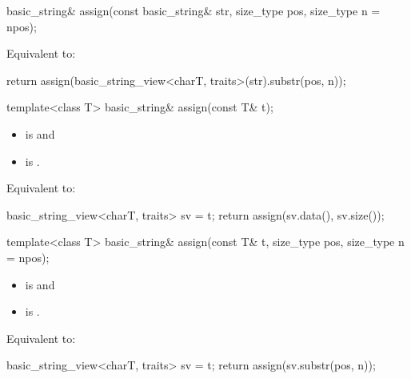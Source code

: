 %
\begin{itemdecl}
basic_string& assign(const basic_string& str, size_type pos, size_type n = npos);
\end{itemdecl}

\begin{itemdescr}
\pnum
\effects
Equivalent to:
\begin{codeblock}
return assign(basic_string_view<charT, traits>(str).substr(pos, n));
\end{codeblock}
\end{itemdescr}

%
\begin{itemdecl}
template<class T>
  basic_string& assign(const T& t);
\end{itemdecl}

\begin{itemdescr}
\pnum
\constraints
\begin{itemize}
\item
{} is
 and
\item
{} is
.
\end{itemize}

\pnum
\effects
Equivalent to:
\begin{codeblock}
basic_string_view<charT, traits> sv = t;
return assign(sv.data(), sv.size());
\end{codeblock}
\end{itemdescr}

%
\begin{itemdecl}
template<class T>
  basic_string& assign(const T& t, size_type pos, size_type n = npos);
\end{itemdecl}

\begin{itemdescr}
\pnum
\constraints
\begin{itemize}
\item
{} is
 and
\item
{} is
.
\end{itemize}

\pnum
\effects Equivalent to:
\begin{codeblock}
basic_string_view<charT, traits> sv = t;
return assign(sv.substr(pos, n));
\end{codeblock}
\end{itemdescr}

